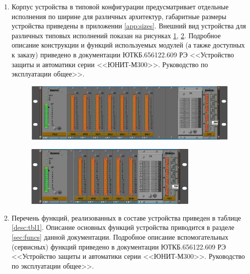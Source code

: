 \documentclass[a4paper, 12pt,table, hidelinks, DIV=calc]{extarticle} %
\begin{document}
\begin{enumerate}[label=\arabic{section}.\arabic{subsection}.\arabic*, labelsep=4pt, leftmargin=0pt, itemindent=57pt]

\item
Корпус устройства в типовой конфигурации предусматривает отдельные исполнения по ширине для различных архитектур, габаритные размеры устройства приведены в приложении \ref{app:sizes}. Внешний вид устройства для различных типовых исполнений показан на рисунках \ref{device:img1}, \ref{device:img2}. Подробное описание конструкции и функций используемых модулей (а также доступных к заказу) приведено в документации ЮТКБ.656122.609 РЭ <<Устройство защиты и автоматики серии <<ЮНИТ-М300>>. Руководство по эксплуатации общее>>.

\vspace{3mm}
\begin{figure}[H]
\centering
\includegraphics[width=1\textwidth,height=1\textheight,keepaspectratio]{img2.jpg}
\label{device:img1}
\end{figure}

\vspace{3mm}
\begin{figure}[H]
\centering
\includegraphics[width=0.8\textwidth,height=0.8\textheight,keepaspectratio]{img3.jpg}
\label{device:img2}
\end{figure}

\item
Перечень функций, реализованных в составе устройства приведен в таблице \ref{desc:tbl1}. Описание основных функций устройства приводится в разделе \ref{sec:funcs} данной документации. Подробное описание вспомогательных (сервисных) функций приведено в документации ЮТКБ.656122.609 РЭ <<Устройство защиты и автоматики серии <<ЮНИТ-М300>>. Руководство по эксплуатации общее>>.


\end{enumerate}
\end{document}
